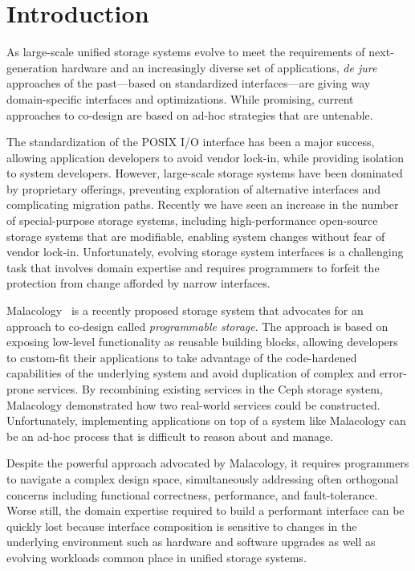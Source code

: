 \section{Introduction}
\label{sec:intro}

As large-scale unified storage systems evolve to meet the requirements of
next-generation hardware and an increasingly diverse set of applications,
\emph{de jure} approaches of the past---based on standardized interfaces---are
giving way domain-specific interfaces and optimizations. While promising,
current approaches to co-design are based on ad-hoc strategies that are
untenable.

The standardization of the POSIX I/O interface has been a major success,
allowing application developers to avoid vendor lock-in, while providing
isolation to system developers. However, large-scale storage systems have been
dominated by proprietary offerings, preventing exploration of alternative
interfaces and complicating migration paths. Recently we have seen an increase
in the number of special-purpose storage systems, including high-performance
open-source storage systems that are modifiable, enabling system changes
without fear of vendor lock-in. Unfortunately, evolving storage system
interfaces is a challenging task that involves domain expertise and requires
programmers to forfeit the protection from change afforded by narrow
interfaces.

Malacology~\cite{sevilla:eurosys17} is a recently proposed storage system that
advocates for an approach to co-design called \emph{programmable storage}. The
approach is based on exposing low-level functionality as reusable building
blocks, allowing developers to custom-fit their applications to take advantage
of the code-hardened capabilities of the underlying system and avoid
duplication of complex and error-prone services. By recombining existing
services in the Ceph storage system, Malacology demonstrated how two
real-world services could be constructed. Unfortunately, implementing
applications on top of a system like Malacology can be an ad-hoc process
that is difficult to reason about and manage.

Despite the powerful approach advocated by Malacology, it requires programmers
to navigate a complex design space, simultaneously addressing often orthogonal
concerns including functional correctness, performance, and fault-tolerance.
Worse still, the domain expertise required to build a performant interface can
be quickly lost because interface composition is sensitive to changes in the
underlying environment such as hardware and software upgrades as well as
evolving workloads common place in unified storage systems.

